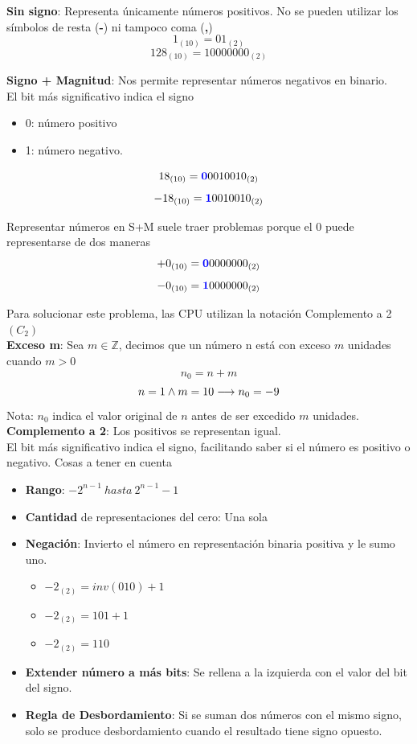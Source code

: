 \documentclass[10pt,a4paper]{article}
\begin{document}
\textbf{Sin signo}: Representa únicamente números positivos. No se pueden utilizar los símbolos de resta (\textbf{-}) ni tampoco coma (\textbf{,})
\[1_{(10)} = 01_{(2)}\]
\[128_{(10)} = 1000 0000_{(2)}\]

\textbf{Signo + Magnitud}: Nos permite representar números negativos en binario. \\ El bit más significativo indica el signo
\begin{itemize}
    \item 0: número positivo
    \item 1: número negativo.
\end{itemize}

\[18_{(10)} = \textcolor{blue}{\textbf{0}}0010010_{(2)}\]
\[-18_{(10)} = \textcolor{blue}{\textbf{1}}0010010_{(2)}\]

Representar números en S+M suele traer problemas porque el 0 puede representarse de dos maneras
\[+0_{(10)} = \textcolor{blue}{\textbf{0}}0000000_{(2)}\]
\[-0_{(10)} = \textcolor{blue}{\textbf{1}}0000000_{(2)}\]

Para solucionar este problema, las CPU utilizan la notación Complemento a 2 \((C_{2})\) \\

\textbf{Exceso m}: Sea \( m \in \mathbb{Z} \), decimos que un número n está con exceso \(m\) unidades cuando \(m>0\) 
\[n_{0}=n+m\]
\[n=1 \land m=10 \longrightarrow n_{0}=-9 \]
Nota: \(n_{0}\) indica el valor original de \(n\)  antes de ser excedido \(m\) unidades.  \\

\textbf{Complemento a 2}: Los positivos se representan igual. \\ 
El bit más significativo indica el signo, facilitando saber si el número es positivo o negativo.
Cosas a tener en cuenta
\begin{itemize}
    \item \textbf{Rango}: \( -2^{n-1} \ hasta \ 2^{n-1}-1 \)
    \item \textbf{Cantidad} de representaciones del cero: Una sola
    \item \textbf{Negación}: Invierto el número en representación binaria positiva y le sumo uno.
    \begin{itemize}
        \item \(-2_{(2)} = inv(010) + 1\)
        \item \(-2_{(2)} = 101 + 1\)
        \item \(-2_{(2)} = 110\)
    \end{itemize}
    \item \textbf{Extender número a más bits}: Se rellena a la izquierda con el valor del bit del signo.
    \item \textbf{Regla de Desbordamiento}: Si se suman dos números con el mismo signo, solo se produce desbordamiento cuando el resultado tiene signo opuesto.
\end{itemize}
\end{document}
